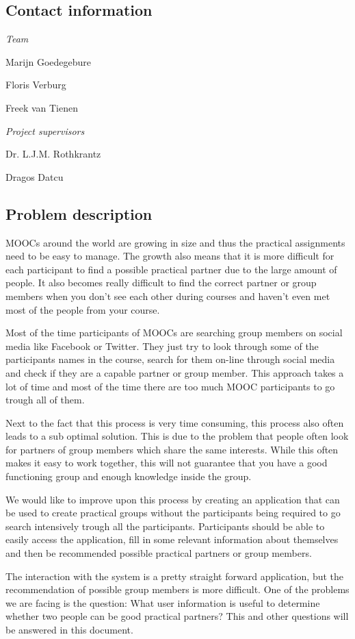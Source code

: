 \documentclass[]{article}
\begin{document}
\subsection{Contact information}
\emph{Team}

Marijn Goedegebure

Floris Verburg

Freek van Tienen

\noindent\emph{Project supervisors}

Dr. L.J.M. Rothkrantz

Dragos Datcu

\subsection{Problem description}
MOOCs around the world are growing in size and thus the practical assignments need to be easy to manage.
The growth also means that it is more difficult for each participant to find a possible practical partner due to the large amount of people.
It also becomes really difficult to find the correct partner or group members when you don't see each other during courses and haven't even met most of the people from your course.

Most of the time participants of MOOCs are searching group members on social media like Facebook or Twitter.
They just try to look through some of the participants names in the course, search for them on-line through social media and check if they are a capable partner or group member.
This approach takes a lot of time and most of the time there are too much MOOC participants to go trough all of them.

Next to the fact that this process is very time consuming, this process also often leads to a sub optimal solution.
This is due to the problem that people often look for partners of group members which share the same interests.
While this often makes it easy to work together, this will not guarantee that you have a good functioning group and enough knowledge inside the group.

We would like to improve upon this process by creating an application that can be used to create practical groups without the participants being required to go search intensively trough all the participants.
Participants should be able to easily access the application, fill in some relevant information about themselves and then be recommended possible practical partners or group members.

The interaction with the system is a pretty straight forward application, but the recommendation of possible group members is more difficult.
One of the problems we are facing is the question: What user information is useful to determine whether two people can be good practical partners?
This and other questions will be answered in this document.
\end{document}
